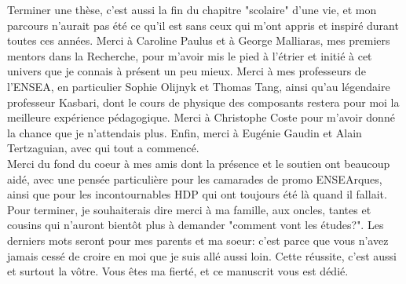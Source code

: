 {Terminer une thèse, c'est aussi la fin du chapitre "scolaire" d'une vie, et mon parcours n'aurait pas été ce qu'il est sans ceux qui m'ont appris et inspiré durant toutes ces années. Merci à Caroline Paulus et à George Malliaras, mes premiers mentors dans la Recherche, pour m'avoir mis le pied à l'étrier et initié à cet univers que je connais à présent un peu mieux. Merci à mes professeurs de l'ENSEA, en particulier Sophie Olijnyk et Thomas Tang, ainsi qu'au légendaire professeur Kasbari, dont le cours de physique des composants restera pour moi la meilleure expérience pédagogique. Merci à Christophe Coste pour m'avoir donné la chance que je n'attendais plus. Enfin, merci à Eugénie Gaudin et Alain Tertzaguian, avec qui tout a commencé. \\

Merci du fond du coeur à mes amis dont la présence et le soutien ont beaucoup aidé, avec une pensée particulière pour les camarades de promo ENSEArques, ainsi que pour les incontournables HDP qui ont toujours été là quand il fallait. \\

Pour terminer, je souhaiterais dire merci à ma famille, aux oncles, tantes et cousins qui n'auront bientôt plus à demander "comment vont les études?". Les derniers mots seront pour mes parents et ma soeur: c'est parce que vous n'avez jamais cessé de croire en moi que je suis allé aussi loin. Cette réussite, c'est aussi et surtout la vôtre. Vous êtes ma fierté, et ce manuscrit vous est dédié.
}




